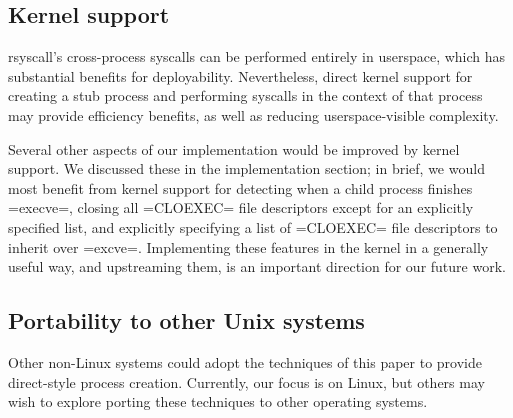 \documentclass{acmart}
\begin{document}
\subsection{Kernel support}
rsyscall's cross-process syscalls can be performed entirely in userspace,
which has substantial benefits for deployability.
Nevertheless, direct kernel support for creating a stub process and performing syscalls in the context of that process
may provide efficiency benefits, as well as reducing userspace-visible complexity.

Several other aspects of our implementation would be improved by kernel support.
We discussed these in the implementation section;
in brief, we would most benefit from kernel support for
detecting when a child process finishes =execve=,
closing all =CLOEXEC= file descriptors except for an explicitly specified list,
and explicitly specifying a list of =CLOEXEC= file descriptors to inherit over =excve=.
Implementing these features in the kernel in a generally useful way, and upstreaming them,
is an important direction for our future work.
\subsection{Portability to other Unix systems}
Other non-Linux systems
could adopt the techniques of this paper
to provide direct-style process creation.
Currently, our focus is on Linux,
but others may wish to explore porting these techniques to other operating systems.
\end{document}
